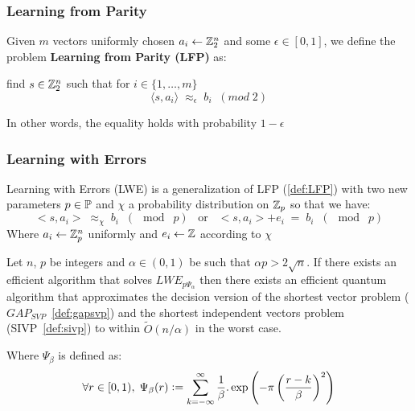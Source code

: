 \documentclass[a4paper,12pt]{article}
\begin{document}
\subsubsection{Learning from Parity}
\label{sec:org915f73d}
 \begin{definition}
  \label{def:LFP}
  Given $m$ vectors uniformly chosen  $a_i \gets \Z^n_2$ and some $\epsilon \in [0,1]$, we
  define the problem \textbf{Learning from Parity (LFP)} as:

  find $s \in \Z^n_2$ such that for $i \in \{1,\dots,m\}$
     $$ \langle{s, a_i}\rangle \; \approx_\epsilon \; b_i \;\; (mod\; 2) $$

     In other words, the equality holds with probability $1 - \epsilon$

\end{definition}

\subsubsection{Learning with Errors}
\label{sec:org60510e2}
\begin{definition}\label{def:LWE}
  Learning with Errors (LWE) is a generalization of LFP (\ref{def:LFP}) with two new parameters $p \in \P$ and $\chi$ a probability distribution on $\Z_p$ so that we have:
\[
  <s, a_i> \; \approx_\chi \; b_i \;\; (\mod\; p) \;\;\; \text{or} \;\;\; <s, a_i> + e_i \; = \;  b_i \;\; (\mod\; p) 
    \]
     Where $a_i \gets \Z^n_p$ uniformly and $e_i \gets \Z$ according to $\chi$

\end{definition}

\begin{theorem}
  Let $n$, $p$ be integers and $\alpha \in (0, 1)$ be such that $\alpha p > 2\sqrt{n}$. If
  there exists an efficient algorithm that solves $LWE_{p \Psi_\alpha}$ then there
  exists an efficient quantum algorithm that approximates the decision version
  of the shortest vector problem ($GAP_{SVP}$~\ref{def:gapsvp}) and the
  shortest independent vectors problem (SIVP~\ref{def:sivp}) to within
  $\tilde{O}(n/\alpha)$ in the worst case.

  Where $\Psi_\beta$ is defined as:
  $$
  \forall r \in [0,1), \; \Psi_\beta(r) \defsym \sum_{k=-\infty}^\infty{\frac{1}{\beta} . \exp{\left( -\pi \left( \frac{r-k}{\beta} \right)^2 \right)}}
  $$
\end{theorem}
\end{document}
